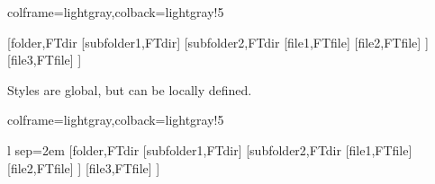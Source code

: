 \documentclass[11pt,a4paper]{ltxdoc}
\begin{document}
\begin{tcblisting}{colframe=lightgray,colback=lightgray!5}
\begin{ForestDirTree}%
    [font=\sffamily,coliconfolder=yellow!50!pink,iconfiles,coliconfile=teal,vsep=0.5em]%
    {}
    [folder,FTdir
        [subfolder1,FTdir]
        [subfolder2,FTdir
            [file1,FTfile]
            [file2,FTfile]
        ]
        [file3,FTfile]
    ]
\end{ForestDirTree}
\end{tcblisting}

Styles are global, but can be locally defined.

\begin{tcblisting}{colframe=lightgray,colback=lightgray!5}
\begin{ForestDirTree}%
    [font=\sffamily,coliconfolder=yellow!50!pink,iconfiles,coliconfile=teal,vsep=0.5em]%
    {l sep=2em}
    [folder,FTdir
        [subfolder1,FTdir]
        [subfolder2,FTdir
            [file1,FTfile]
            [file2,FTfile]
        ]
        [file3,FTfile]
    ]
\end{ForestDirTree}
\end{tcblisting}
\end{document}

